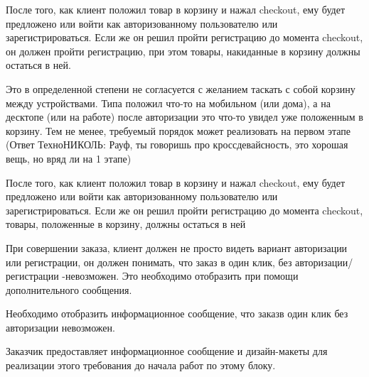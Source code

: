 {


\begin{wiki}
После того, как клиент положил товар в корзину и нажал checkout, ему будет предложено или войти как авторизованному пользователю или зарегистрироваться. Если же он решил пройти регистрацию до момента checkout, он должен пройти регистрацию, при этом товары, накиданные в корзину должны остаться в ней. 
\end{wiki}

\begin{teamidea}
Это в определенной степени не согласуется с желанием таскать с собой корзину между устройствами. Типа положил что-то на мобильном (или дома), а на десктопе (или на работе) после авторизации это что-то увидел уже положенным в корзину. Тем не менее, требуемый порядок может реализовать на первом этапе
(Ответ ТехноНИКОЛЬ: Рауф, ты говоришь про кроссдевайсность, это хорошая вещь, но вряд ли на 1 этапе)
\end{teamidea}


\begin{itogo}
После того, как клиент положил товар в корзину и нажал checkout, ему будет предложено или войти как авторизованному пользователю или зарегистрироваться. Если же он решил пройти регистрацию до момента checkout, товары, положенные в корзину, должны остаться в ней
\end{itogo}


}

{

\begin{wiki}
При совершении заказа, клиент должен не просто видеть вариант авторизации или регистрации, он должен понимать, что заказ в один клик, без авторизации/регистрации -невозможен. Это необходимо отобразить при помощи дополнительного сообщения.
\end{wiki}


\begin{itogo}
Необходимо отобразить информационное сообщение, что заказв один клик без авторизации невозможен.
\end{itogo}

Заказчик предоставляет информационное сообщение и дизайн-макеты для реализации этого требования до начала работ по этому блоку.


}

